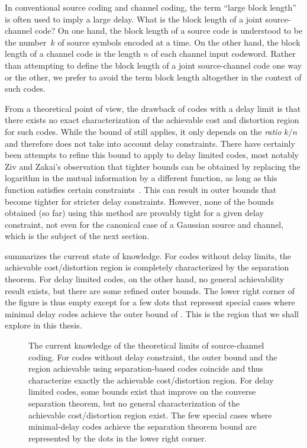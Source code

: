 \begin{remark}
  \label{rem:blocklength}
  In conventional source coding and channel coding, the term ``large block
  length'' is often used to imply a large delay. What is the block length of a
  joint source-channel code? On one hand, the block length of a source code is
  understood to be the number~$k$ of source symbols encoded at a time. On the
  other hand, the block length of a channel code is the length $n$ of each
  channel input codeword. Rather than attempting to define the block length of a
  joint source-channel code one way or the other, we prefer to avoid the term
  block length altogether in the context of such codes. 
\end{remark}

From a theoretical point of view, the drawback of codes with a delay limit is
that there exists no exact characterization of the achievable cost and
distortion region for such codes. While the bound of 
still applies, it only depends on the \emph{ratio} $k/n$ and therefore does not
take into account delay constraints. There have certainly been attempts to
refine this bound to apply to delay limited codes, most notably Ziv and Zakai's
observation that tighter bounds can be obtained by replacing the logarithm in
the mutual information by a different function, as long as this function
satisfies certain constraints~\cite{ZivZ1973}. This can result in outer bounds
that become tighter for stricter delay constraints. However, none of the bounds
obtained (so far) using this method are provably tight for a given delay
constraint, not even for the canonical case of a Gaussian source and channel,
which is the subject of the next section.

 summarizes the current state of knowledge. For codes
without delay limits, the achievable cost/distortion region is completely
characterized by the separation theorem. For delay limited
codes, on the other hand, no general achievability result exists, but there are
some refined outer bounds. The lower right corner of the figure is thus empty
except for a few dots that represent special cases where minimal delay codes
achieve the outer bound of . This is the region that
we shall explore in this thesis. 

\begin{figure}
  \begin{center}
    
  \end{center}
  \caption{The current knowledge of the theoretical limits of source-channel
  coding. For codes without delay constraint, the outer bound and the
  region achievable using separation-based codes coincide and thus characterize
  exactly the achievable cost/distortion region. For delay limited codes, some
  bounds exist that improve on the converse separation theorem, but no general
  characterization of the achievable cost/distortion region exist. The few
  special cases where minimal-delay codes achieve the separation theorem bound
  are represented by the dots in the lower right corner.}
  \label{fig:achievableregions}
\end{figure}


